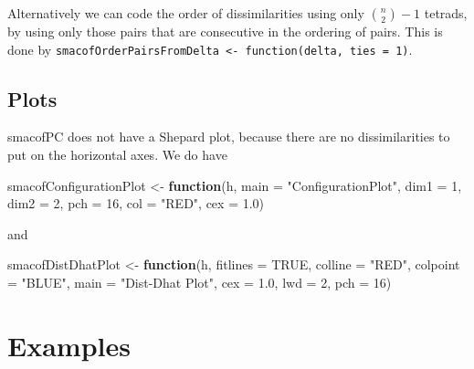 \documentclass[
  12pt,
]{article}
\newenvironment{Shaded}{\begin{snugshade}}{\end{snugshade}}
\newcommand{\AttributeTok}[1]{\textcolor[rgb]{0.13,0.29,0.53}{#1}}
\newcommand{\ConstantTok}[1]{\textcolor[rgb]{0.56,0.35,0.01}{#1}}
\newcommand{\ControlFlowTok}[1]{\textcolor[rgb]{0.13,0.29,0.53}{\textbf{#1}}}
\newcommand{\DecValTok}[1]{\textcolor[rgb]{0.00,0.00,0.81}{#1}}
\newcommand{\FloatTok}[1]{\textcolor[rgb]{0.00,0.00,0.81}{#1}}
\newcommand{\NormalTok}[1]{#1}
\newcommand{\OtherTok}[1]{\textcolor[rgb]{0.56,0.35,0.01}{#1}}
\newcommand{\StringTok}[1]{\textcolor[rgb]{0.31,0.60,0.02}{#1}}
\begin{document}
Alternatively we can code the order of dissimilarities using only
\(\binom{n}{2}-1\) tetrads, by using only those pairs that are
consecutive in the ordering of pairs. This is done by
\texttt{smacofOrderPairsFromDelta\ \textless{}-\ function(delta,\ ties\ =\ 1)}.

\subsection{Plots}\label{plots}

smacofPC does not have a Shepard plot, because there are no
dissimilarities to put on the horizontal axes. We do have

\begin{Shaded}
\begin{Highlighting}[]
\NormalTok{smacofConfigurationPlot }\OtherTok{\textless{}{-}}
  \ControlFlowTok{function}\NormalTok{(h,}
           \AttributeTok{main =} \StringTok{"ConfigurationPlot"}\NormalTok{,}
           \AttributeTok{dim1 =} \DecValTok{1}\NormalTok{,}
           \AttributeTok{dim2 =} \DecValTok{2}\NormalTok{,}
           \AttributeTok{pch =} \DecValTok{16}\NormalTok{,}
           \AttributeTok{col =} \StringTok{"RED"}\NormalTok{,}
           \AttributeTok{cex =} \FloatTok{1.0}\NormalTok{)}
\end{Highlighting}
\end{Shaded}

and

\begin{Shaded}
\begin{Highlighting}[]
\NormalTok{smacofDistDhatPlot }\OtherTok{\textless{}{-}} \ControlFlowTok{function}\NormalTok{(h,}
                               \AttributeTok{fitlines =} \ConstantTok{TRUE}\NormalTok{,}
                               \AttributeTok{colline =} \StringTok{"RED"}\NormalTok{,}
                               \AttributeTok{colpoint =} \StringTok{"BLUE"}\NormalTok{,}
                               \AttributeTok{main =} \StringTok{"Dist{-}Dhat Plot"}\NormalTok{,}
                               \AttributeTok{cex =} \FloatTok{1.0}\NormalTok{,}
                               \AttributeTok{lwd =} \DecValTok{2}\NormalTok{,}
                               \AttributeTok{pch =} \DecValTok{16}\NormalTok{)}
\end{Highlighting}
\end{Shaded}

\section{Examples}\label{examples}
\end{document}
